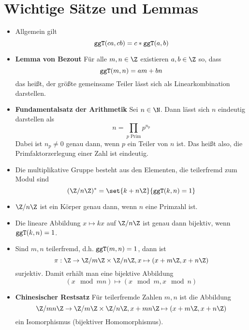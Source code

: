 \section{Wichtige Sätze und Lemmas}
\begin{itemize}
	\item Allgemein gilt
	\begin{equation*}
		\texttt{ggT}(ca,cb)=c*\texttt{ggT}(a,b)
	\end{equation*}
	\item \textbf{Lemma von Bezout}
	Für alle $m,n\in\Z$ existieren $a,b\in\Z$ so, dass
	\begin{equation*}
		\texttt{ggT}(m,n)=am+bn
	\end{equation*}
	das heißt, der größte gemeinsame Teiler lässt sich als Linearkombination darstellen.
	\item \textbf{Fundamentalsatz der Arithmetik} Sei $n\in\N$. Dann lässt sich $n$ eindeutig darstellen als
	\begin{equation*}
		n=\prod_{p\text{ Prim}}  p^{n_p}
	\end{equation*}
	Dabei ist $n_p\neq 0$ genau dann, wenn $p$ ein Teiler von $n$ ist. Das heißt also, die Primfaktorzerlegung einer Zahl ist eindeutig.
	\item Die multiplikative Gruppe besteht aus den Elementen, die teilerfremd zum Modul sind
	\begin{equation*}
		(\Z/n\Z)^\ast =\set{k+n\Z}{\ggT(k,n)=1}
	\end{equation*}
	\item $\Z/n\Z$ ist ein Körper genau dann, wenn $n$ eine Primzahl ist.

	\item Die lineare Abbildung $x\mapsto kx$ auf $\Z/n\Z$ ist genau dann bijektiv, wenn $\texttt{ggT}(k,n)=1$.
	
	\item Sind $m,n$ teilerfremd, d.h. $\texttt{ggT}(m,n)=1$, dann ist
	\begin{equation*}
		\pi:\Z\rightarrow\Z/m\Z\times\Z/n\Z, x\mapsto(x+m\Z,x+n\Z)
	\end{equation*}
	surjektiv. Damit erhält man eine bijektive Abbildung
	\begin{equation*}
		(x\mod mn)\mapsto (x\mod m,x\mod n)
	\end{equation*}
	\item \textbf{Chinesischer Restsatz}
	Für teilerfremde Zahlen $m,n$ ist die Abbildung
	\begin{equation*}
		\Z/mn\Z\rightarrow \Z/m\Z\times \Z/n\Z, 
		x+mn\Z\mapsto (x+m\Z,x+n\Z)
	\end{equation*}
	ein Isomorphismus (bijektiver Homomorphismus).


\end{itemize}
